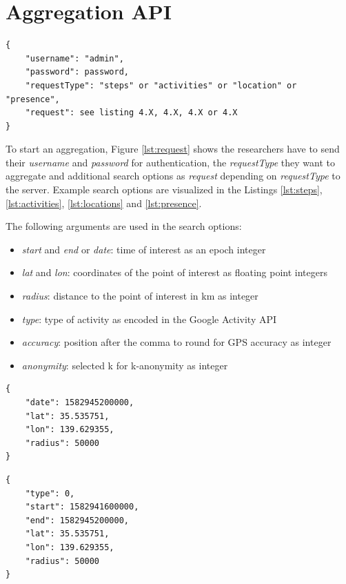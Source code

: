 \section{Aggregation API}

\begin{lstlisting}[caption=Initial aggregation request from researcher, label={lst:request}]
{
    "username": "admin",
    "password": password,
    "requestType": "steps" or "activities" or "location" or "presence",
    "request": see listing 4.X, 4.X, 4.X or 4.X
}
\end{lstlisting}

To start an aggregation, Figure \ref{lst:request} shows the researchers have to send their \textit{username} and \textit{password} for authentication, the \textit{requestType} they want to aggregate and additional search options as \textit{request} depending on \textit{requestType} to the server. Example search options are visualized in the Listings \ref{lst:steps}, \ref{lst:activities}, \ref{lst:locations} and \ref{lst:presence}.

The following arguments are used in the search options:
\begin{itemize}
    \item \textit{start} and \textit{end} or \textit{date}: time of interest as an epoch integer
    \item \textit{lat} and \textit{lon}: coordinates of the point of interest as floating point integers
    \item \textit{radius}: distance to the point of interest in km as integer
    \item \textit{type}: type of activity as encoded in the Google Activity API
    \item \textit{accuracy}: position after the comma to round for GPS accuracy as integer
    \item \textit{anonymity}: selected k for k-anonymity as integer
\end{itemize}

\begin{lstlisting}[caption=Search options for steps, label={lst:steps}]
{
    "date": 1582945200000,
    "lat": 35.535751,
    "lon": 139.629355,
    "radius": 50000
}
\end{lstlisting}

\begin{lstlisting}[caption=Search options for activities, label={lst:activities}]
{
    "type": 0,
    "start": 1582941600000,
    "end": 1582945200000,
    "lat": 35.535751,
    "lon": 139.629355,
    "radius": 50000
}
\end{lstlisting}

